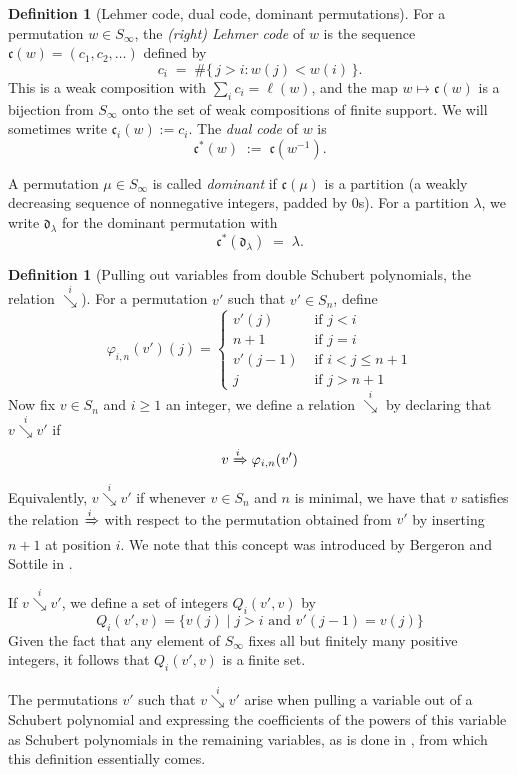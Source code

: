 \documentclass[a4paper,fleqn]{cas-sc}
\theoremstyle{definition}
\newtheorem{definition}[lemma]{Definition}
\theoremstyle{remark}
\numberwithin{equation}{subsection}
\newcommand{\downvar}[1]{\stackrel{#1}{\searrow}}
\newcommand{\Tom}[1]{\xRightarrow{#1}}
\newcommand{\dom}{\mathfrak{d}}
\newcommand{\code}{\mathfrak{c}}
\begin{document}
\begin{definition}[Lehmer code, dual code, dominant permutations]\label{definition:codestuff}
For a permutation $w\in S_\infty$, the \emph{(right) Lehmer code} of $w$ is the sequence $\code(w)=(c_1,c_2,\ldots)$ defined by
$$c_i \;=\; \#\{\,j>i : w(j)<w(i)\,\}.$$
This is a weak composition with $\sum_i c_i=\ell(w)$, and the map $w\mapsto\code(w)$ is a bijection from $S_\infty$ onto the set of weak compositions of finite support. We will sometimes write $\code_i(w):=c_i$. The \emph{dual code} of $w$ is
$$\code^*(w) \;:=\; \code(w^{-1}).$$

A permutation $\mu\in S_\infty$ is called \emph{dominant} if $\code(\mu)$ is a partition (a weakly decreasing sequence of nonnegative integers, padded by $0$s). For a partition $\lambda$, we write $\dom_\lambda$ for the dominant permutation with
$$\code^*(\dom_\lambda) \;=\; \lambda.$$
\end{definition}

\begin{definition}[Pulling out variables from double Schubert polynomials, the relation $\downvar{i}$] \label{definition:polysequence}
		For a permutation $v'$ such that $v'\in S_{n}$, define
		$$\varphi_{i,n}(v')(j)=\begin{cases}
			v'(j)&\mbox{ if }j<i\\
			n+1&\mbox{ if }j=i\\
			v'(j-1)&\mbox{ if }i<j\leq n+1\\
			j&\mbox{ if }j>n+1
		\end{cases}$$
		Now fix $v\in S_n$ and $i\geq 1$ an integer, we define a relation $\downvar{i}$ by declaring that $v\downvar{i} v'$ if 
		$$v\Tom{i}\varphi_{i,n}(v')$$
		Equivalently, $v\downvar{i} v'$ if whenever $v\in S_n$ and $n$ is minimal, we have that $v$ satisfies the relation $\Tom{i}$ with respect to the permutation obtained from $v'$ by inserting $n+1$ at position $i$. We note that this concept was introduced by Bergeron and Sottile in \cite{bsskew}.
		
		If $v\downvar{i} v'$, we define a set of integers $Q_i(v',v)$ by
		$$Q_i(v',v)=\{v(j)\mid j>i\mbox{ and }v'(j-1)=v(j)\}$$
		Given the fact that any element of $S_\infty$ fixes all but finitely many positive integers, it follows that $Q_i(v',v)$ is a finite set.
		
		The permutations $v'$ such that $v\downvar{i} v'$ arise when pulling a variable out of a Schubert polynomial and expressing the coefficients of the powers of this variable as Schubert polynomials in the remaining variables, as is done in \cite{coprod}, from which this definition essentially comes.

  \end{definition}
  
\end{document}
